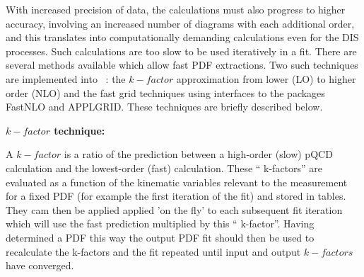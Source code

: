 
With increased precision of data, the calculations must also progress to higher accuracy, involving an increased number of diagrams with each 
additional order, and this translates into computationally demanding 
calculations even for the DIS processes. Such calculations 
are too slow to be used iteratively in a fit.
There are several methods available which allow fast PDF extractions.  
Two such techniques
are implemented into \fitter\ : the $k-factor$ approximation from lower (LO) to higher order (NLO) and the fast grid techniques using interfaces to the 
packages FastNLO and APPLGRID. These techniques are briefly described below.  


\begin{description}
\item \bf {$k-factor$ technique:} \rm

A $k-factor$ is a ratio of the prediction between a high-order (slow)
pQCD calculation and the lowest-order (fast) calculation.  These `` k-factors''
are evaluated as a function of the kinematic variables relevant to
 the measurement 
for a fixed PDF (for example the first iteration of the fit) and stored in 
tables. They cam then be applied applied 'on the fly' to each subsequent fit 
iteration which will use the fast prediction multiplied by this `` k-factor''.
Having determined a PDF this way the output PDF fit should then be used to 
recalculate the k-factors and the fit repeated until input and output 
$k-factors$ have converged. 


\end{description}
